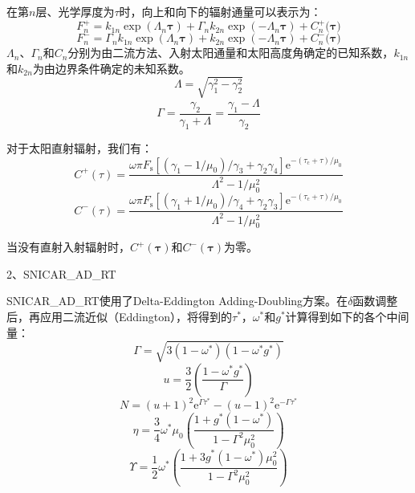 在第$n$层、光学厚度为\(\tau\)时，向上和向下的辐射通量可以表示为：
\begin{equation}
  F_{n}^{+} = k_{1n}\exp\left( \Lambda_{n}\mathbf{\tau} \right) + \Gamma_{n}k_{2n}\exp\left( {- \Lambda}_{n}\mathbf{\tau} \right) + C_{n}^{+}(\mathbf{\tau)}
\end{equation}
\begin{equation}
  F_{n}^{-} = \Gamma_{n}k_{1n}\exp\left( \Lambda_{n}\mathbf{\tau} \right) + k_{2n}\exp\left( {- \Lambda}_{n}\mathbf{\tau} \right) + C_{n}^{-}(\mathbf{\tau)}
\end{equation}
%
\(\Lambda_{n}\)、\(\Gamma_{n}\)和\(C_{n}\)分别为由二流方法、入射太阳通量和太阳高度角确定的已知系数，\(k_{1n}\)和\(k_{2n}\)为由边界条件确定的未知系数。
\begin{equation}
  \Lambda = \sqrt{\gamma_{1}^{2} - \gamma_{2}^{2}}
\end{equation}
\begin{equation}
  \Gamma = \frac{\gamma_{2}}{\gamma_{1} + \Lambda} = \frac{\gamma_{1} - \Lambda}{\gamma_{2}}
\end{equation}

对于太阳直射辐射，我们有：
\begin{equation}
  C^{+}(\tau) = \frac{\omega \pi F_{\mathrm s}\left\lbrack \left( \gamma_{1} - 1/\mu_{0} \right)/\gamma_{3} + \gamma_{2}\gamma_{4} \right\rbrack {\mathrm e}^{- \left( \tau_{\mathrm c} + \tau \right)/\mu_{0}}}{\Lambda^{2} - 1/\mu_{0}^{2}}
\end{equation}
\begin{equation}
  C^{-}(\tau) = \frac{\omega \pi F_{\mathrm s}\left\lbrack \left( \gamma_{1} + 1/\mu_{0} \right)/\gamma_{4} + \gamma_{2}\gamma_{3} \right\rbrack {\mathrm e}^{- \left( \tau_{\mathrm c} + \tau \right)/\mu_{0}}}{\Lambda^{2} - 1/\mu_{0}^{2}}
\end{equation}

当没有直射入射辐射时，\(C^{+}(\mathbf{\tau})\)和\(C^{-}(\mathbf{\tau})\)为零。

2、SNICAR\_AD\_RT

SNICAR\_AD\_RT使用了Delta-Eddington
Adding-Doubling方案。在$\delta$函数调整后，再应用二流近似（Eddington），将得到的$\tau^*$，$\omega^*$和$g^*$计算得到如下的各个中间量：
\begin{equation}
  \Gamma = \sqrt{3(1 - \omega^{*})(1 - \omega^{*}g^{*})}
\end{equation}
\begin{equation}
  u = \frac{3}{2}\left( \frac{1 - \omega^{*}g^{*}}{\Gamma} \right)
\end{equation}
\begin{equation}
  N = {(u + 1)}^{2}{\mathrm e}^{\Gamma\tau^{*}} - {(u - 1)}^{2}{\mathrm e}^{- \Gamma\tau^{*}}
\end{equation}
\begin{equation}
  \eta = \frac{3}{4}\omega^{*}\mu_{0}\left( \frac{1 + g^{*}(1 - \omega^{*})}{1 - \Gamma^{2}\mu_{0}^{2}} \right)
\end{equation}
\begin{equation}
  \Upsilon = \frac{1}{2}\omega^{*}\left( \frac{1 + {3g}^{*}(1 - \omega^{*})\mu_{0}^{2}}{1 - \Gamma^{2}\mu_{0}^{2}} \right)
\end{equation}

